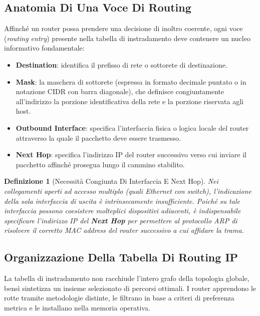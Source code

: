 \documentclass[11pt, a4paper]{article}
\newtheorem{theorem}{Definizione}
\begin{document}
\subsection{Anatomia Di Una Voce Di Routing}

Affinché un router possa prendere una decisione di inoltro coerente, ogni voce (\emph{routing entry}) presente nella tabella di instradamento deve contenere un nucleo informativo fondamentale:


\begin{itemize}
    \item \textbf{Destination}: identifica il prefisso di rete o sottorete di destinazione.
    \item \textbf{Mask}: la maschera di sottorete (espressa in formato decimale puntato o in notazione CIDR con barra diagonale), che definisce congiuntamente all'indirizzo la porzione identificativa della rete e la porzione riservata agli host.
    \item \textbf{Outbound Interface}: specifica l'interfaccia fisica o logica locale del router attraverso la quale il pacchetto deve essere trasmesso.
    \item \textbf{Next Hop}: specifica l'indirizzo IP del router successivo verso cui inviare il pacchetto affinché prosegua lungo il cammino stabilito.
\end{itemize}

\begin{theorem}[Necessità Congiunta Di Interfaccia E Next Hop]
Nei collegamenti aperti ad accesso multiplo (quali Ethernet con switch), l'indicazione della sola interfaccia di uscita è intrinsecamente insufficiente. Poiché su tale interfaccia possono coesistere molteplici dispositivi adiacenti, è indispensabile specificare l'indirizzo IP del \textbf{Next Hop} per permettere al protocollo ARP di risolvere il corretto MAC address del router successivo a cui affidare la trama.
\end{theorem}

\subsection{Organizzazione Della Tabella Di Routing IP}

La tabella di instradamento non racchiude l'intero grafo della topologia globale, bensì sintetizza un insieme selezionato di percorsi ottimali. I router apprendono le rotte tramite metodologie distinte, le filtrano in base a criteri di preferenza metrica e le installano nella memoria operativa.
\end{document}
